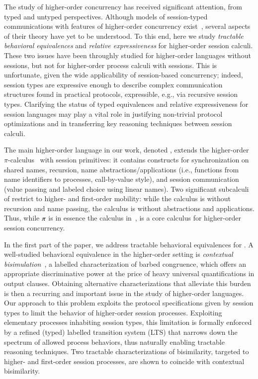 The study of higher-order concurrency has received significant attention, 
from typed and untyped perspectives.
Although models of session-typed 
communications with features of higher-order concurrency exist~\cite{tlca07,DBLP:journals/jfp/GayV10},
several aspects of their theory 
have yet to be understood. To this end, here we study
 \emph{tractable behavioral equivalences} and \emph{relative expressiveness}
for higher-order session calculi. 
These two issues 
have been throughly studied
for higher-order languages without sessions,
but not for higher-order process calculi with sessions.
This is unfortunate, given the wide applicability of session-based concurrency; indeed,
session types are expressive enough to describe complex 
communication structures found in practical protocols,  expressible, e.g., via recursive session types.
Clarifying the status of typed equivalences and relative expressiveness for session languages
may play a vital role in justifying non-trivial protocol optimizations and in transferring key reasoning techniques between session calculi.

The main higher-order language in our work, denoted \HOp,
extends the higher-order $\pi$-calculus~\cite{SangiorgiD:expmpa} with session primitives:
it contains constructs for 
synchronization on shared names, 
recursion, 
name abstractions/applications (i.e., functions from name identifiers to processes, call-by-value style),
and session communication (value passing and
labeled choice using linear names). 
Two significant subcalculi of \HOp restrict to higher- and first-order mobility:
while the \HO calculus is \HOp without recursion and name passing,
the \sessp calculus is \HOp without abstractions and applications.
Thus, 
while $\pi$ is in essence the calculus in~\cite{honda.vasconcelos.kubo:language-primitives}, 
\HO  is  a core calculus for higher-order session concurrency.

In the first part of the paper, we address tractable behavioral equivalences
for \HOp.
A well-studied behavioral equivalence in the higher-order setting is \emph{contextual bisimulation}~\cite{San96H},
a labelled characterization of barbed congruence, 
which offers an appropriate discriminative power at the price of heavy universal quantifications in output clauses.
Obtaining alternative characterizations that alleviate this burden
is then a recurring and important issue 
in the study of higher-order languages.
Our approach to this problem 
exploits the protocol specifications given by session types to  limit 
the behavior of higher-order session processes. 
Exploiting elementary processes inhabiting session types, 
this limitation is formally enforced by 
a refined (typed) labelled transition system (LTS)
that narrows down the spectrum of allowed process behaviors, 
thus naturally enabling tractable reasoning techniques. 
Two tractable characterizations of bisimilarity, 
targeted to higher- and first-order session processes,
are shown to coincide with contextual bisimilarity.

